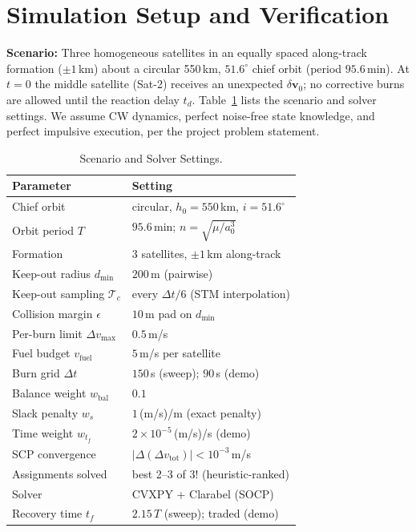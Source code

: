 \documentclass[10pt,twocolumn,letterpaper]{article}
\begin{document}
\section{Simulation Setup and Verification}
\label{sec:setup}

\textbf{Scenario:} Three homogeneous satellites in an equally spaced
along-track formation ($\pm1$\,km) about a circular 550\,km, $51.6^\circ$
chief orbit (period $95.6$\,min). At $t{=}0$ the middle satellite (Sat-2)
receives an unexpected $\delta\mathbf{v}_0$; no corrective burns are allowed
until the reaction delay $t_d$. Table~\ref{tab:params} lists the scenario and
solver settings. We assume CW dynamics, perfect noise-free state knowledge,
and perfect impulsive execution, per the project problem statement.

\begin{table}[t]
\centering
\caption{Scenario and Solver Settings.}
\label{tab:params}
\small
\begin{tabular}{@{}ll@{}}
\toprule
\textbf{Parameter} & \textbf{Setting} \\
\midrule
Chief orbit & circular, $h_0 = 550$\,km, $i = 51.6^\circ$ \\
Orbit period $T$ & $95.6$\,min; $n = \sqrt{\mu/a_0^3}$ \\
Formation & 3 satellites, $\pm1$\,km along-track \\
Keep-out radius $d_{\min}$ & $200$\,m (pairwise) \\
Keep-out sampling $\mathcal{T}_c$ & every $\Delta t/6$ (STM interpolation) \\
Collision margin $\epsilon$ & $10$\,m pad on $d_{\min}$ \\
Per-burn limit $\Delta v_{\max}$ & $0.5$\,m/s \\
Fuel budget $v_{\mathrm{fuel}}$ & $5$\,m/s per satellite \\
Burn grid $\Delta t$ & $150$\,s (sweep); $90$\,s (demo) \\
Balance weight $w_{\mathrm{bal}}$ & $0.1$ \\
Slack penalty $w_s$ & $1$\,(m/s)/m (exact penalty) \\
Time weight $w_{t_f}$ & $2\times10^{-5}$\,(m/s)/s (demo) \\
SCP convergence & $|\Delta(\Delta v_{\mathrm{tot}})| < 10^{-3}$\,m/s \\
Assignments solved & best 2--3 of $3!$ (heuristic-ranked) \\
Solver & CVXPY + Clarabel (SOCP) \\
Recovery time $t_f$ & $2.15\,T$ (sweep); traded (demo) \\
\bottomrule
\end{tabular}
\end{table}
\end{document}
